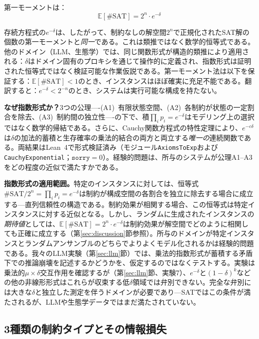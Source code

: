 \documentclass[11pt,a4paper]{article}
\begin{document}
第一モーメントは：
\begin{equation}
\mathbb{E}[\#\text{SAT}] = 2^n \cdot e^{-\delta}
\label{eq:first-moment-exp}
\end{equation}

存続方程式の$e^{-\delta}$は、したがって、制約なしの解空間$2^n$で正規化されたSAT解の個数の第一モーメントと\emph{同一}である。これは類推ではなく数学的恒等式である。他のドメイン（LLM、生態学）では、同じ関数形式が構造的類推により適用される：$\delta$はドメイン固有のプロキシを通じて操作的に定義され、指数形式は証明された恒等式ではなく検証可能な作業仮説である。第一モーメント法\cite{alon2016}は以下を保証する：$\mathbb{E}[\#\text{SAT}] < 1$のとき、インスタンスはほぼ確実に充足不能である。翻訳すると：$e^{-\delta} < 2^{-n}$のとき、システムは実行可能な構成を持たない。

\textbf{なぜ指数形式か？}3つの公理----(A1)~有限状態空間、(A2)~各制約が状態の一定割合を除去、(A3)~制約間の独立性----の下で、積$\prod_i p_i = e^{-\delta}$はモデリング上の選択ではなく数学的帰結である。さらに、Cauchy関数方程式の特性定理により、$e^{-c\delta}$は$\delta$の加法的蓄積と生存確率の乗法的結合の両方と両立する\emph{唯一の}連続関数である\cite{aczel1966}。両結果はLean~4で形式検証済み（モジュール\texttt{AxiomsToExp}および\texttt{CauchyExponential}；$\texttt{sorry} = 0$）。経験的問題は、所与のシステムが公理A1--A3をどの程度の近似で満たすかである。

\textbf{指数形式の適用範囲。}特定のインスタンスに対しては、恒等式$\#\text{SAT}/2^n = \prod_i p_i = e^{-\delta}$は制約が構成空間の各割合を独立に除去する場合に成立する---直列信頼性\cite{barlow1975}の構造である。制約効果が相関する場合、この恒等式は特定インスタンスに対する近似となる。しかし、ランダムに生成されたインスタンスの\emph{期待値}としては、$\mathbb{E}[\#\text{SAT}] = 2^n \cdot e^{-\delta}$は制約効果が解空間でどのように相関しても正確に成立する（第\ref{sec:discussion}節参照）。所与のドメインが特定インスタンスとランダムアンサンブルのどちらでよりよくモデル化されるかは経験的問題である。我々のLLM実験（第\ref{sec:llm}節）では、乗法的指数形式が蓄積する矛盾下での推論崩壊を記述するかどうかを、仮定するのではなくテストする。実験は乗法的$\mu \times \delta$交互作用を確認するが（第\ref{sec:llm}節、実験7）、$e^{-\delta}$と$(1-\delta)^k$などの他の非線形形式はこれらが収束する低$\delta$領域では弁別できない。完全な弁別には大きな$\delta$と独立した測定を伴うドメインが必要であり---SATではこの条件が満たされるが、LLMや生態学データではまだ満たされていない。

\subsection{3種類の制約タイプとその情報損失}
\end{document}
